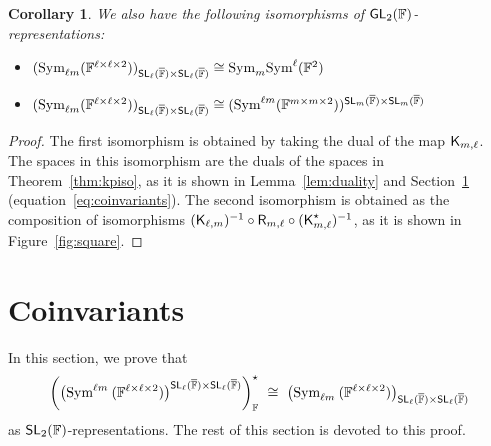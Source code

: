 \documentclass[a4paper]{extarticle}
\newcommand{\IF}{\mathbb{F}}
\newcommand{\oIF}{{\overline{\mathbb{F}}}}
\newcommand{\GL}{\textsf{\textup{GL}}}
\newcommand{\SL}{\textsf{\textup{SL}}}
\newcommand{\Sym}{\textup{Sym}}
\newcommand{\Hermite}{\textsf{\textup{R}}}
\newcommand{\KP}{\textsf{\textup{K}}}
\numberwithin{theorem}{section}
\newtheorem{corollary}[theorem]{Corollary}
\theoremstyle{definition}
\begin{document}
\begin{corollary}
We also have the following isomorphisms of $\GL_2(\IF)$-representations:
\begin{itemize}
    \item $
    (\Sym_{\ell m}(\IF^{\ell\times\ell\times 2}))_{\SL_\ell(\oIF)\times \SL_\ell(\oIF)}\cong \Sym_m\Sym^\ell(\IF^2) 
    $
    \item$
    (\Sym_{\ell m}(\IF^{\ell\times \ell\times 2}))_{\SL_\ell(\oIF)\times \SL_\ell(\oIF)}\cong (\Sym^{\ell m}(\IF^{m\times m\times 2}))^{\SL_m(\oIF)\times \SL_m(\oIF)}
    $
\end{itemize}
\end{corollary}

\begin{proof}
The first isomorphism is obtained by taking the dual of the map $\KP_{m,\ell}$. The spaces in this isomorphism are the duals of the spaces in Theorem~\ref{thm:kpiso}, as it is shown in Lemma~\ref{lem:duality} and Section~\ref{sec:coinvariants} (equation~\eqref{eq:coinvariants}).
The second isomorphism is obtained as the composition of isomorphisms $ (\KP_{\ell,m})^{-1}\circ\Hermite_{m,\ell}\circ(\KP_{m,\ell}^\star)^{-1}$, as it is shown in Figure~\ref{fig:square}.
\end{proof}


\section{Coinvariants}\label{sec:coinvariants}

In this section, we prove that
\begin{equation}\label{eq:coinvariantsdual}
\left(\big(\Sym^{\ell m}\:(\IF^{\ell \times \ell \times 2})\big)^{\SL_\ell(\oIF)\times \SL_\ell(\oIF)}\right)^\star_\IF
\ \cong\ \left(\Sym_{\ell m}\:(\IF^{\ell \times \ell \times 2})\right)_{\SL_\ell(\oIF)\times \SL_\ell(\oIF)}
\end{equation}
as $\SL_2(\IF)$-representations.
The rest of this section is devoted to this proof.
\end{document}
